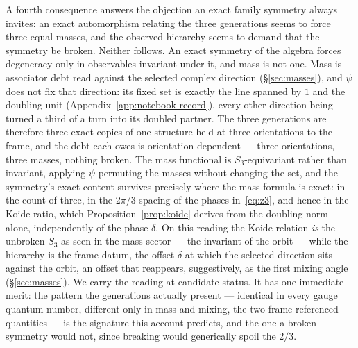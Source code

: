 A fourth consequence answers the objection an exact family symmetry always invites: an exact
automorphism relating the three generations seems to force three equal masses, and the observed
hierarchy seems to demand that the symmetry be broken. Neither follows. An exact symmetry of the
algebra forces degeneracy only in observables invariant under it, and mass is not one. Mass is
associator debt read against the selected complex direction (\S\ref{sec:masses}), and $\psi$ does
not fix that direction: its fixed set is exactly the line spanned by $1$ and the doubling unit
(Appendix~\ref{app:notebook-record}), every other direction being turned a third of a turn into
its doubled partner. The three generations are therefore three exact copies of one structure held
at three orientations to the frame, and the debt each owes is orientation-dependent --- three
orientations, three masses, nothing broken. The mass functional is $S_3$-equivariant rather than
invariant, applying $\psi$ permuting the masses without changing the set, and the symmetry's
exact content survives precisely where the mass formula is exact: in the count of three, in the
$2\pi/3$ spacing of the phases in~\eqref{eq:z3}, and hence in the Koide ratio, which
Proposition~\ref{prop:koide} derives from the doubling norm alone, independently of the phase
$\delta$. On this reading the Koide relation \emph{is} the unbroken $S_3$ as seen in the mass
sector --- the invariant of the orbit --- while the hierarchy is the frame datum, the offset
$\delta$ at which the selected direction sits against the orbit, an offset that reappears,
suggestively, as the first mixing angle (\S\ref{sec:masses}). We carry the reading at candidate
status. It has one immediate merit: the pattern the generations actually present --- identical in
every gauge quantum number, different only in mass and mixing, the two frame-referenced quantities
--- is the signature this account predicts, and the one a broken symmetry would not, since
breaking would generically spoil the $2/3$.

